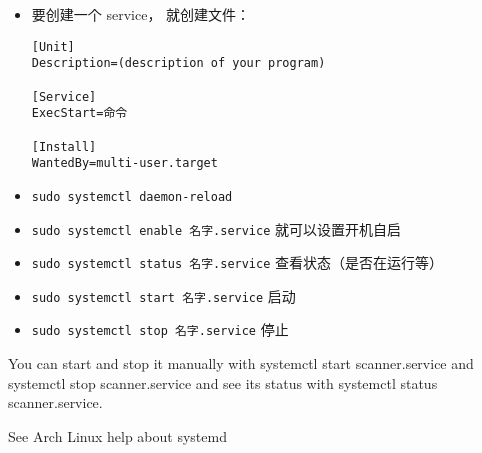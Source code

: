 
\begin{itemize}
\item 要创建一个 service， 就创建文件：
\begin{lstlisting}[language=none,caption=/etc/systemd/system/名字.service]
[Unit]
Description=(description of your program)

[Service]
ExecStart=命令

[Install]
WantedBy=multi-user.target
\end{lstlisting}
\item \verb|sudo systemctl daemon-reload|
\item \verb|sudo systemctl enable 名字.service| 就可以设置开机自启
\item \verb|sudo systemctl status 名字.service| 查看状态（是否在运行等）
\item \verb|sudo systemctl start 名字.service| 启动
\item \verb|sudo systemctl stop 名字.service| 停止
\end{itemize}

You can start and stop it manually with systemctl start scanner.service and systemctl stop scanner.service and see its status with systemctl status scanner.service.

See Arch Linux help about systemd